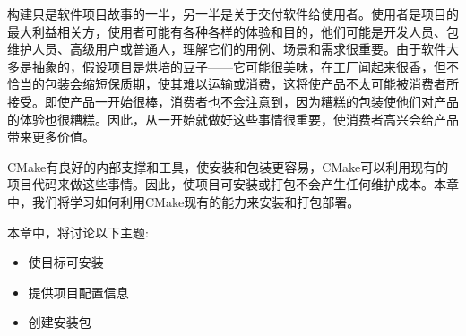 构建只是软件项目故事的一半，另一半是关于交付软件给使用者。使用者是项目的最大利益相关方，使用者可能有各种各样的体验和目的，他们可能是开发人员、包维护人员、高级用户或普通人，理解它们的用例、场景和需求很重要。由于软件大多是抽象的，假设项目是烘培的豆子——它可能很美味，在工厂闻起来很香，但不恰当的包装会缩短保质期，使其难以运输或消费，这将使产品不太可能被消费者所接受。即使产品一开始很棒，消费者也不会注意到，因为糟糕的包装使他们对产品的体验也很糟糕。因此，从一开始就做好这些事情很重要，使消费者高兴会给产品带来更多价值。

CMake有良好的内部支撑和工具，使安装和包装更容易，CMake可以利用现有的项目代码来做这些事情。因此，使项目可安装或打包不会产生任何维护成本。本章中，我们将学习如何利用CMake现有的能力来安装和打包部署。

本章中，将讨论以下主题:

\begin{itemize}
\item 
使目标可安装

\item 
提供项目配置信息

\item 
创建安装包
\end{itemize}
